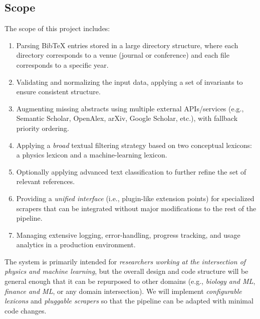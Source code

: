 \documentclass[12pt]{article}
\begin{document}
\subsection{Scope}
The scope of this project includes:
\begin{enumerate}[label=\alph*)]
  \item Parsing BibTeX entries stored in a large directory structure, where each directory corresponds to a venue (journal or conference) and each file corresponds to a specific year.
  \item Validating and normalizing the input data, applying a set of invariants to ensure consistent structure.
  \item Augmenting missing abstracts using multiple external APIs/services (e.g., Semantic Scholar, OpenAlex, arXiv, Google Scholar, etc.), with fallback priority ordering.
  \item Applying a \emph{broad} textual filtering strategy based on two conceptual lexicons: a physics lexicon and a machine-learning lexicon. 
  \item Optionally applying advanced text classification to further refine the set of relevant references.
  \item Providing a \emph{unified interface} (i.e., plugin-like extension points) for specialized scrapers that can be integrated without major modifications to the rest of the pipeline.
  \item Managing extensive logging, error-handling, progress tracking, and usage analytics in a production environment.
\end{enumerate}

The system is primarily intended for \emph{researchers working at the intersection of physics and machine learning}, but the overall design and code structure will be general enough that it can be repurposed to other domains (e.g., \emph{biology and ML}, \emph{finance and ML}, or any domain intersection). We will implement \emph{configurable lexicons} and \emph{pluggable scrapers} so that the pipeline can be adapted with minimal code changes.
\end{document}
